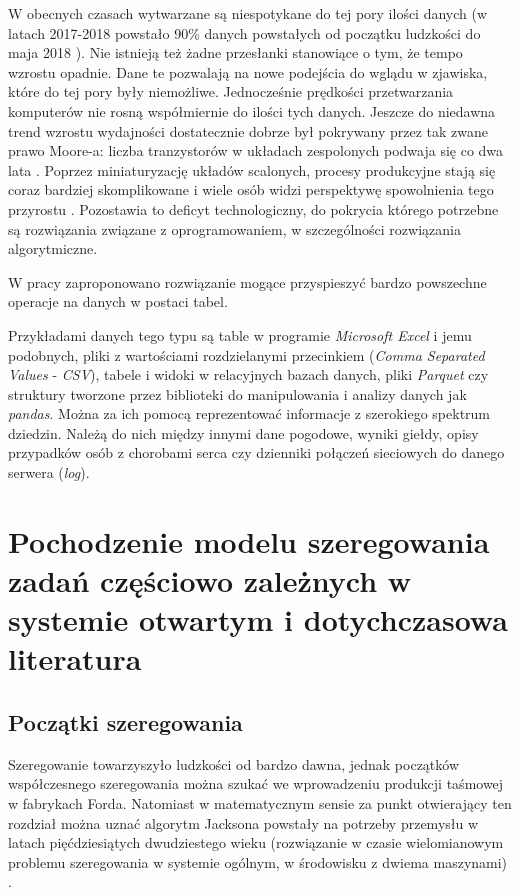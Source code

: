 \documentclass[brudnopis]{xmgr}
\begin{document}
\introduction
W obecnych czasach wytwarzane są niespotykane do tej pory ilości danych (w latach 2017-2018 powstało 90\% danych powstałych od początku ludzkości do maja 2018 \cite{Forbes:2018:FBS}).
Nie istnieją też żadne przesłanki stanowiące o tym, że tempo wzrostu opadnie.
Dane te pozwalają na nowe podejścia do wglądu w zjawiska, które do tej pory były niemożliwe.
Jednocześnie prędkości przetwarzania komputerów nie rosną współmiernie do ilości tych danych. Jeszcze do niedawna trend wzrostu wydajności dostatecznie dobrze był pokrywany przez tak zwane prawo Moore-a: liczba tranzystorów w układach zespolonych podwaja się co dwa lata \cite{MOORE:1965:X}. Poprzez miniaturyzację układów scalonych, procesy produkcyjne stają się coraz bardziej skomplikowane i wiele osób widzi perspektywę spowolnienia tego przyrostu \cite{NOTMOORE:2020:X}. Pozostawia to deficyt technologiczny, do pokrycia którego potrzebne są rozwiązania związane z oprogramowaniem, w szczególności rozwiązania algorytmiczne.
\medskip

W pracy zaproponowano rozwiązanie mogące przyspieszyć bardzo powszechne operacje na danych w postaci tabel.
\medskip

Przykładami danych tego typu są table w programie \emph{Microsoft Excel} i jemu podobnych, pliki z wartościami rozdzielanymi przecinkiem (\emph{Comma Separated Values} - \emph{CSV}), tabele i widoki w relacyjnych bazach danych, pliki \emph{Parquet} \cite{parquet} czy struktury tworzone przez biblioteki do manipulowania i analizy danych jak \emph{pandas}.
Można za ich pomocą reprezentować informacje z szerokiego spektrum dziedzin. Należą do nich między innymi dane pogodowe, wyniki giełdy, opisy przypadków osób z chorobami serca czy dzienniki połączeń sieciowych do danego serwera (\emph{log}).



\chapter{Pochodzenie modelu szeregowania zadań częściowo zależnych w systemie otwartym i dotychczasowa literatura}


\section{Początki szeregowania}
Szeregowanie towarzyszyło ludzkości od bardzo dawna, jednak początków współczesnego szeregowania można szukać we wprowadzeniu produkcji taśmowej w fabrykach Forda. Natomiast w matematycznym sensie za punkt otwierający ten rozdział można uznać algorytm Jacksona powstały na potrzeby przemysłu w latach pięćdziesiątych dwudziestego wieku (rozwiązanie w czasie wielomianowym problemu szeregowania w systemie ogólnym, w środowisku z dwiema maszynami) \cite{jackson1956extension}.
\medskip
\end{document}
